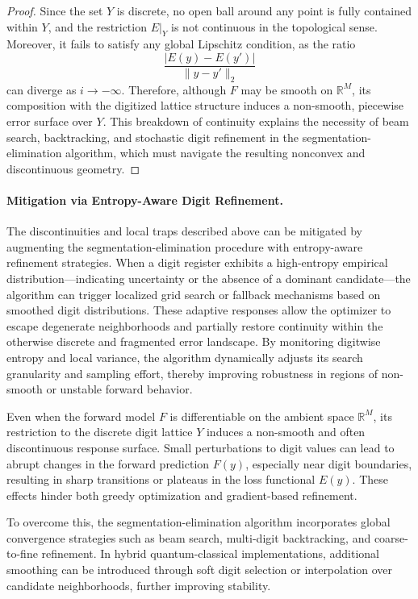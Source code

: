 \documentclass[aps,twocolumn,superscriptaddress,nofootinbib]{revtex4}
\begin{document}
\begin{proof}
Since the set \( Y \) is discrete, no open ball around any point is fully contained within \( Y \), and the restriction \( E|_Y \) is not continuous in the topological sense. Moreover, it fails to satisfy any global Lipschitz condition, as the ratio
\begin{equation}
\frac{|E(y) - E(y')|}{\|y - y'\|_2}
\end{equation}
can diverge as \( i \to -\infty \). Therefore, although \( F \) may be smooth on \( \mathbb{R}^M \), its composition with the digitized lattice structure induces a non-smooth, piecewise error surface over \( Y \). This breakdown of continuity explains the necessity of beam search, backtracking, and stochastic digit refinement in the segmentation-elimination algorithm, which must navigate the resulting nonconvex and discontinuous geometry.
\end{proof}

\paragraph{Mitigation via Entropy-Aware Digit Refinement.}
The discontinuities and local traps described above can be mitigated by augmenting the segmentation-elimination procedure with entropy-aware refinement strategies. When a digit register exhibits a high-entropy empirical distribution---indicating uncertainty or the absence of a dominant candidate---the algorithm can trigger localized grid search or fallback mechanisms based on smoothed digit distributions. These adaptive responses allow the optimizer to escape degenerate neighborhoods and partially restore continuity within the otherwise discrete and fragmented error landscape. By monitoring digitwise entropy and local variance, the algorithm dynamically adjusts its search granularity and sampling effort, thereby improving robustness in regions of non-smooth or unstable forward behavior.

Even when the forward model \( F \) is differentiable on the ambient space \( \mathbb{R}^M \), its restriction to the discrete digit lattice \( Y \) induces a non-smooth and often discontinuous response surface. Small perturbations to digit values can lead to abrupt changes in the forward prediction \( F(y) \), especially near digit boundaries, resulting in sharp transitions or plateaus in the loss functional \( E(y) \). These effects hinder both greedy optimization and gradient-based refinement.

To overcome this, the segmentation-elimination algorithm incorporates global convergence strategies such as beam search, multi-digit backtracking, and coarse-to-fine refinement. In hybrid quantum-classical implementations, additional smoothing can be introduced through soft digit selection or interpolation over candidate neighborhoods, further improving stability.
\end{document}
